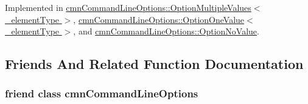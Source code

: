 Implemented in \hyperlink{classcmn_command_line_options_1_1_option_multiple_values_aeae0f5051c46d779f38a026753a7e5d0}{cmn\-Command\-Line\-Options\-::\-Option\-Multiple\-Values$<$ \-\_\-element\-Type $>$}, \hyperlink{classcmn_command_line_options_1_1_option_one_value_a2b55be408875478f887e01550837cd1e}{cmn\-Command\-Line\-Options\-::\-Option\-One\-Value$<$ \-\_\-element\-Type $>$}, and \hyperlink{classcmn_command_line_options_1_1_option_no_value_ad033bac0fb01cf076f726f9461d9a484}{cmn\-Command\-Line\-Options\-::\-Option\-No\-Value}.



\subsection{Friends And Related Function Documentation}
\hypertarget{classcmn_command_line_options_1_1_option_base_a18923f23ed3914806f1edf878a64b422}{
\subsubsection[{cmn\-Command\-Line\-Options}]{\setlength{\rightskip}{0pt plus 5cm}friend class {\bf cmn\-Command\-Line\-Options}\hspace{0.3cm}{\ttfamily [friend]}}}\label{classcmn_command_line_options_1_1_option_base_a18923f23ed3914806f1edf878a64b422}


